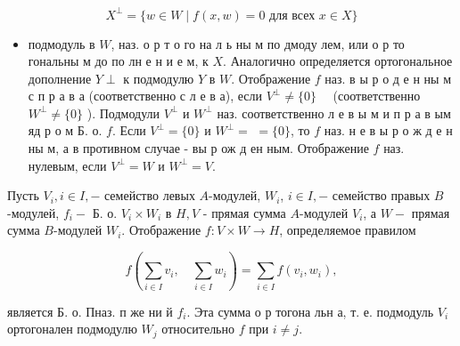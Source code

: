 \documentclass[10pt]{article}
\begin{document}
\[

X^{\perp}=\{w \in W \mid f(x, w)=0 \text { для всех } x \in X\}

\]



\begin{itemize}

  \item подмодуль в $W$, наз. о р т о го на л ь ны м по дмоду лем, или о р то гональны м до по лн е н и е м, к $X$. Аналогично определяется ортогональное дополнение $Y \perp$ к подмодулю $Y$ в $W$. Отображение $f$ наз. в ы р о д е н ны м с п р а в а (соответственно с л е в а), если $V^{\perp} \neq\{0\} \quad$ (соответственно $W^{\perp} \neq\{0\}$ ). Подмодули $V^{\perp}$ и $W^{\perp}$ наз. соответственно л е в ы м и п р а в ым яд р о м Б. о. $f$. Если $V^{\perp}=\{0\}$ и $W^{\perp}=$ $=\{0\}$, то $f$ наз. н е в ы р о ж д е н ны м, а в противном случае - вы р ож д ен ным. Отображение $f$ наз. нулевым, если $V^{\perp}=W$ и $W^{\perp}=V$.

\end{itemize}



Пусть $V_{i}, i \in I,-$ семейство левых $A$-модулей, $W_{i}$, $i \in I,-$ семейство правых $B$-модулей, $f_{i}-$ Б. о. $V_{i} \times W_{i}$ в $H, V$ - прямая сумма $A$-модулей $V_{i}$, а $W-$ прямая сумма $B$-модулей $W_{i}$. Отображение $f: V \times W \rightarrow H$, определяемое правилом



\[

f\left(\sum_{i \in I} v_{i}, \quad \sum_{i \in I} w_{i}\right)=\sum_{i \in I} f\left(v_{i}, w_{i}\right),

\]



является Б. о. Пназ. п же ни й $f_{i}$. Эта сумма о р тогона льн а, т. е. подмодуль $V_{i}$ ортогонален подмодулю $W_{j}$ относительно $f$ при $i \neq j$.
\end{document}
